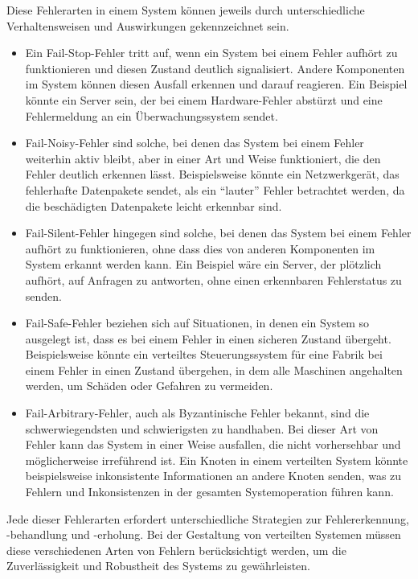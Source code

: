 Diese Fehlerarten in einem System können jeweils durch unterschiedliche Verhaltensweisen und Auswirkungen gekennzeichnet sein.
\begin{itemize}
\item Ein Fail-Stop-Fehler tritt auf, wenn ein System bei einem Fehler aufhört zu funktionieren und diesen Zustand deutlich signalisiert. Andere Komponenten im System können diesen Ausfall erkennen und darauf reagieren. Ein Beispiel könnte ein Server sein, der bei einem Hardware-Fehler abstürzt und eine Fehlermeldung an ein Überwachungssystem sendet.

\item Fail-Noisy-Fehler sind solche, bei denen das System bei einem Fehler weiterhin aktiv bleibt, aber in einer Art und Weise funktioniert, die den Fehler deutlich erkennen lässt. Beispielsweise könnte ein Netzwerkgerät, das fehlerhafte Datenpakete sendet, als ein \enquote{lauter} Fehler betrachtet werden, da die beschädigten Datenpakete leicht erkennbar sind.

\item Fail-Silent-Fehler hingegen sind solche, bei denen das System bei einem Fehler aufhört zu funktionieren, ohne dass dies von anderen Komponenten im System erkannt werden kann. Ein Beispiel wäre ein Server, der plötzlich aufhört, auf Anfragen zu antworten, ohne einen erkennbaren Fehlerstatus zu senden.

\item Fail-Safe-Fehler beziehen sich auf Situationen, in denen ein System so ausgelegt ist, dass es bei einem Fehler in einen sicheren Zustand übergeht. Beispielsweise könnte ein verteiltes Steuerungssystem für eine Fabrik bei einem Fehler in einen Zustand übergehen, in dem alle Maschinen angehalten werden, um Schäden oder Gefahren zu vermeiden.

\item Fail-Arbitrary-Fehler, auch als Byzantinische Fehler bekannt, sind die schwerwiegendsten und schwierigsten zu handhaben. Bei dieser Art von Fehler kann das System in einer Weise ausfallen, die nicht vorhersehbar und möglicherweise irreführend ist. Ein Knoten in einem verteilten System könnte beispielsweise inkonsistente Informationen an andere Knoten senden, was zu Fehlern und Inkonsistenzen in der gesamten Systemoperation führen kann.
\end{itemize}
Jede dieser Fehlerarten erfordert unterschiedliche Strategien zur Fehlererkennung, -behandlung und -erholung. Bei der Gestaltung von verteilten Systemen müssen diese verschiedenen Arten von Fehlern berücksichtigt werden, um die Zuverlässigkeit und Robustheit des Systems zu gewährleisten.

